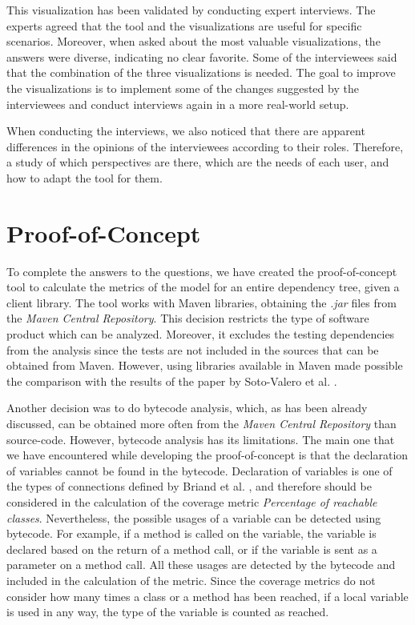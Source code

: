 This visualization has been validated by conducting expert interviews. The experts agreed that the tool and the visualizations are useful for specific scenarios. Moreover, when asked about the most valuable visualizations, the answers were diverse, indicating no clear favorite. Some of the interviewees said that the combination of the three visualizations is needed. The goal to improve the visualizations is to implement some of the changes suggested by the interviewees and conduct interviews again in a more real-world setup.

When conducting the interviews, we also noticed that there are apparent differences in the opinions of the interviewees according to their roles. Therefore, a study of which perspectives are there, which are the needs of each user, and how to adapt the tool for them.

\section{Proof-of-Concept}

To complete the answers to the questions, we have created the proof-of-concept tool to calculate the metrics of the model for an entire dependency tree, given a client library. The tool works with Maven libraries, obtaining the \textit{.jar} files from the \textit{Maven Central Repository}. This decision restricts the type of software product which can be analyzed. Moreover, it excludes the testing dependencies from the analysis since the tests are not included in the sources that can be obtained from Maven. However, using libraries available in Maven made possible the comparison with the results of the paper by Soto-Valero et al. \cite{soto2020comprehensive}.

Another decision was to do bytecode analysis, which, as has been already discussed, can be obtained more often from the \textit{Maven Central Repository} than source-code. However, bytecode analysis has its limitations. The main one that we have encountered while developing the proof-of-concept is that the declaration of variables cannot be found in the bytecode. Declaration of variables is one of the types of connections defined by Briand et al. \cite{briand1999unified}, and therefore should be considered in the calculation of the coverage metric \textit{Percentage of reachable classes}. Nevertheless, the possible usages of a variable can be detected using bytecode. For example, if a method is called on the variable, the variable is declared based on the return of a method call, or if the variable is sent as a parameter on a method call. All these usages are detected by the bytecode and included in the calculation of the metric. Since the coverage metrics do not consider how many times a class or a method has been reached, if a local variable is used in any way, the type of the variable is counted as reached.
